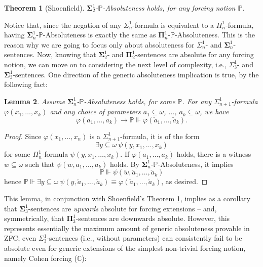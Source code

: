 \documentclass[10pt]{amsart}
\newtheorem{theorem}{Theorem}[section]
\newtheorem{lemma}[theorem]{Lemma}
\theoremstyle{definition}
\begin{document}
\begin{theorem}[Shoenfield]\label{Shoenfield}
    $\boldsymbol\Sigma^1_2$-$\mathbb P$-Absoluteness holds, for any forcing notion $\mathbb P$.
\end{theorem}

Notice that, since the negation of any $\Sigma^1_{n}$-formula is equivalent to a $\Pi^1_n$-formula, having $\boldsymbol\Sigma^1_n$-$\mathbb P$-Absoluteness is exactly the same as $\boldsymbol\Pi^1_n$-$\mathbb P$-Absoluteness. This is the reason why we are going to focus only about absoluteness for $\Sigma^1_n$- and $\boldsymbol\Sigma^1_n$-sentences. Now, knowing that $\boldsymbol\Sigma^1_2$- and $\boldsymbol\Pi^1_2$-sentences are absolute for any forcing notion, we can move on to considering the next level of complexity, i.e., $\Sigma^1_3$- and $\boldsymbol\Sigma^1_3$-sentences. One direction of the generic absoluteness implication is true, by the following fact:

\begin{lemma}\label{upwards}
    Assume $\boldsymbol\Sigma^1_n$-$\mathbb P$-Absoluteness holds, for some $\mathbb P$. For any $\Sigma^1_{n+1}$-formula $\varphi(x_1,\ldots,x_k)$ and any choice of parameters $a_1\subseteq\omega$, $\ldots$, $a_k\subseteq\omega$, we have
    \[\varphi(a_1,\ldots,a_k) \to \mathbb P\Vdash \varphi(\check a_1,\ldots,\check a_k).\]
\end{lemma}

\begin{proof}
    Since $\varphi(x_1,\ldots,x_n)$ is a $\Sigma^1_{n+1}$-formula, it is of the form \[\exists y\subseteq\omega\ \psi(y,x_1,\ldots,x_k)\] for some $\Pi^1_n$-formula $\psi(y,x_1,\ldots,x_k)$. If $\varphi(a_1,\ldots,a_k)$ holds, there is a witness $w\subseteq\omega$ such that $\psi(w,a_1,\ldots,a_k)$ holds. By $\boldsymbol\Sigma^1_n$-$\mathbb P$-Absoluteness, it implies
    \[\mathbb P\Vdash \psi(\check w, \check a_1,\ldots,\check a_k)\]
    hence $\mathbb P\Vdash \exists y\subseteq\omega\ \psi(y,\check a_1,\ldots,\check a_k)\equiv \varphi(\check a_1,\ldots,\check a_k)$, as desired.
\end{proof}

This lemma, in conjunction with Shoenfield's Theorem \ref{Shoenfield}, implies as a corollary that $\boldsymbol\Sigma^1_3$-sentences are \emph{upwards} absolute for forcing extensions -- and, symmetrically, that $\boldsymbol\Pi^1_3$-sentences are {downwards} absolute. However, this represents essentially the maximum amount of generic absoluteness provable in ZFC; even $\Sigma^1_3$-sentences (i.e., without parameters) can consistently fail to be absolute even for generic extensions of the simplest non-trivial forcing notion, namely Cohen forcing ($\mathbb C$):
\end{document}
